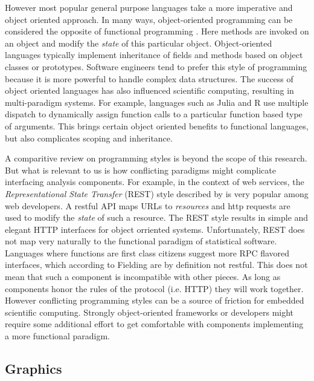 However most popular general purpose languages take a more imperative and object oriented approach. In many ways, object-oriented programming can be considered the opposite of functional programming \citep{pythonfunctional}. Here methods are invoked on an object and modify the \emph{state} of this particular object. Object-oriented languages typically implement inheritance of fields and methods based on object classes or prototypes. Software engineers tend to prefer this style of programming because it is more powerful to handle complex data structures. The success of object oriented languages has also influenced scientific computing, resulting in multi-paradigm systems. For example, languages such as Julia and R use multiple dispatch to dynamically assign function calls to a particular function based type of arguments. This brings certain object oriented benefits to functional languages, but also complicates scoping and inheritance. 

A comparitive review on programming styles is beyond the scope of this research. But what is relevant to us is how conflicting paradigms might complicate interfacing analysis components. For example, in the context of web services, the \emph{Representational State Transfer} (REST) style described by \cite{fielding2000architectural} is very popular among web developers. A restful API maps URLs to \emph{resources} and http requests are used to modify the \emph{state} of such a resource. The REST style results in simple and elegant HTTP interfaces for object orriented systems. Unfortunately, REST does not map very naturally to the functional paradigm of statistical software. Languages where functions are first class citizens suggest more RPC flavored interfaces, which according to Fielding are by definition not restful. This does not mean that such a component is incompatible with other pieces. As long as components honor the rules of the protocol (i.e. HTTP) they will work together. However conflicting programming styles can be a source of friction for embedded scientific computing. Strongly object-oriented frameworks or developers might require some additional effort to get comfortable with components implementing a more functional paradigm.



\subsection{Graphics}

